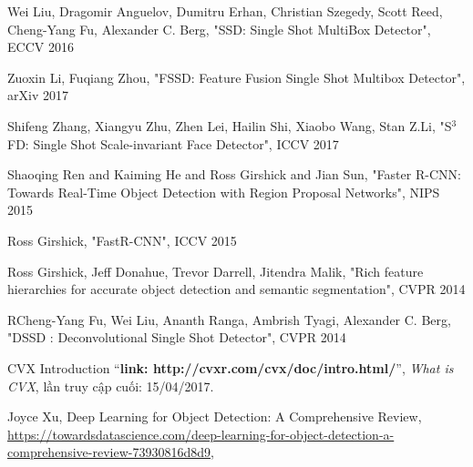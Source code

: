 \documentclass[a4paper]{report}
\begin{document}
	



\begin{thebibliography}{80}

Wei Liu, Dragomir Anguelov, Dumitru Erhan, Christian Szegedy, Scott Reed, Cheng-Yang Fu, Alexander C. Berg, "SSD: Single Shot MultiBox Detector", ECCV 2016

Zuoxin Li, Fuqiang Zhou, "FSSD: Feature Fusion Single Shot Multibox Detector", arXiv 2017

 Shifeng Zhang, Xiangyu Zhu, Zhen Lei, Hailin Shi, Xiaobo Wang, Stan Z.Li, "S$^ 3$FD: Single Shot Scale-invariant Face Detector", ICCV 2017

 Shaoqing Ren and Kaiming He and Ross Girshick and Jian Sun, "Faster {R-CNN}: Towards Real-Time Object Detection
with Region Proposal Networks", NIPS 2015

 Ross Girshick, "Fast{R-CNN}", ICCV 2015

 Ross Girshick, Jeff Donahue, Trevor Darrell, Jitendra Malik, "Rich feature hierarchies for accurate object detection and semantic segmentation", CVPR 2014 

 RCheng-Yang Fu, Wei Liu, Ananth Ranga, Ambrish Tyagi, Alexander C. Berg, "DSSD : Deconvolutional Single Shot Detector", CVPR 2014 

CVX Introduction
``\textbf{link: http://cvxr.com/cvx/doc/intro.html/}'',
\textit{What is CVX}, lần truy cập cuối: 15/04/2017.

Joyce Xu, Deep Learning for Object Detection: A Comprehensive Review,\\
\href {https://towardsdatascience.com/deep-learning-for-object-detection-a-comprehensive-review-73930816d8d9}{https://towardsdatascience.com/deep-learning-for-object-detection-a-comprehensive-review-73930816d8d9},

\end{thebibliography}
\end{document}
